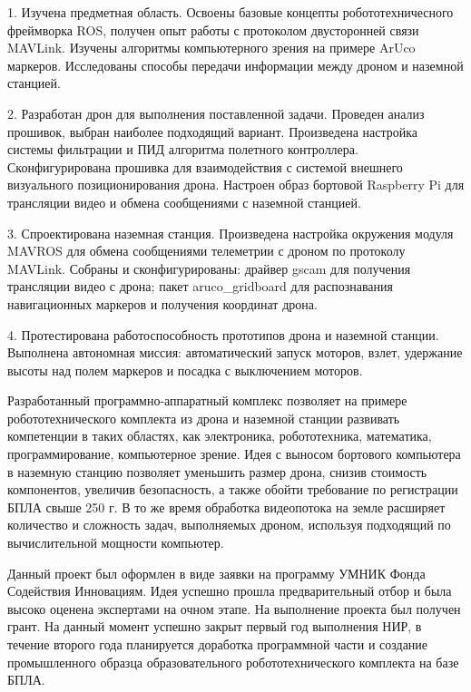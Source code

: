 \documentclass[a4paper,12pt]{article}
\begin{document}
	1. Изучена предметная область. Освоены базовые концепты робототехничесного фреймворка ROS, получен опыт работы с протоколом  двусторонней связи MAVLink. Изучены алгоритмы компьютерного зрения на примере ArUco маркеров. Исследованы способы передачи информации между дроном и наземной станцией.
	
	2. Разработан дрон для выполнения поставленной задачи. Проведен анализ прошивок, выбран наиболее подходящий вариант. Произведена настройка системы фильтрации и ПИД алгоритма полетного контроллера. Сконфигурирована прошивка для взаимодействия с системой внешнего визуального позиционирования дрона. Настроен образ бортовой Raspberry Pi для трансляции видео и обмена сообщениями с наземной станцией.
	
	3. Спроектирована наземная станция. Произведена настройка окружения модуля MAVROS для обмена сообщениями телеметрии с дроном по протоколу MAVLink. Собраны и сконфигурированы: драйвер gscam для получения трансляции видео с дрона; пакет aruco\_grid\-board для распознавания навигационных маркеров и получения координат дрона.
	
	4. Протестирована работоспособность прототипов дрона и наземной станции. Выполнена автономная миссия: автоматический запуск моторов, взлет, удержание высоты над полем маркеров и посадка с выключением моторов.


Разработанный программно-аппаратный комплекс позволяет на примере робототехнического комплекта из дрона и наземной станции развивать компетенции в таких областях, как электроника, робототехника, математика, программирование, компьютерное зрение. Идея с выносом бортового компьютера в наземную станцию позволяет уменьшить размер дрона, снизив стоимость компонентов, увеличив безопасность, а также обойти требование по регистрации БПЛА свыше 250 г. В то же время обработка видеопотока на земле расширяет количество и сложность задач, выполняемых дроном, используя подходящий по вычислительной мощности компьютер.

Данный проект был оформлен в виде заявки на программу УМНИК Фонда Содействия Инновациям. Идея успешно прошла предварительный отбор \cite{umnik} и была высоко оценена экспертами на очном этапе. На выполнение проекта был получен грант. На данный момент успешно закрыт первый год выполнения НИР, в течение второго года планируется доработка программной части и создание промышленного образца образовательного робототехнического комплекта на базе БПЛА.
\pagebreak

\printbibliography
\end{document}
